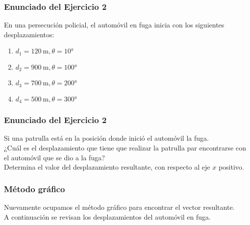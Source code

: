 \documentclass[12pt]{beamer}
\begin{document}
\begin{frame}
\frametitle{Enunciado del Ejercicio 2}
En una persecución policial, el automóvil en fuga inicia con los siguientes desplazamientos:
\begin{enumerate}[<+->]
\item $d_{1} = \SI{120}{\meter}, \theta = \ang{10}$
\item $d_{2} = \SI{900}{\meter}, \theta = \ang{100}$
\item $d_{3} = \SI{700}{\meter}, \theta = \ang{200}$
\item $d_{4} = \SI{500}{\meter}, \theta = \ang{300}$
\end{enumerate}
\end{frame}
\begin{frame}
\frametitle{Enunciado del Ejercicio 2}
Si una patrulla está en la posición donde inició el automóvil la fuga.
\\
\bigskip
\pause
¿Cuál es el desplazamiento que tiene que realizar la patrulla par encontrarse con el automóvil que se dio a la fuga?
\\
\bigskip
\pause
Determina el valor del desplazamiento resultante, con respecto al eje $x$ positivo.
\end{frame}
\begin{frame}
\frametitle{Método gráfico}
Nuevamente ocupamos el método gráfico para encontrar el vector resultante.
\\
\bigskip
\pause
A continuación se revisan los desplazamientos del automóvil en fuga.
\end{frame}
\end{document}
